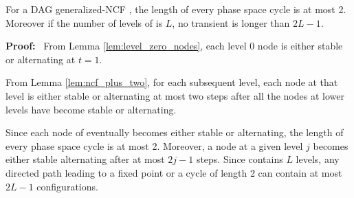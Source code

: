 \begin{theorem}\label{thm:NCF_phase_space}
For a DAG generalized-NCF \cals{},
the length of every phase space cycle is at most 2.
Moreover if the number of levels of  \cals{} is $L$,
no transient is longer than $2L-1$.
\end{theorem}
\noindent
\textbf{Proof:}~ 
From Lemma \ref{lem:level_zero_nodes},
each level 0 node is either stable or alternating at $t=1$.


From Lemma \ref{lem:ncf_plus_two},
for each subsequent level, each node at that level 
is either stable or alternating at most two steps after
all the nodes at lower levels have become stable or alternating.

Since each node of  \cals{} eventually becomes either stable or alternating,
 the length of every phase space cycle is at most 2.
Moreover, a node at a given level $j$ becomes either stable alternating
after at most $2j-1$ steps.
Since  \cals{} contains $L$ levels,
any directed path leading to a fixed point or a cycle of length 2
can contain at most $2L-1$ configurations.
\QED
\fi

